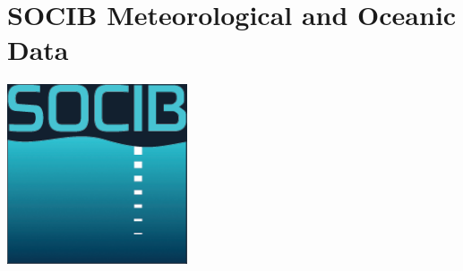 \documentclass[10pt,landscape]{article}
\begin{document}
\parbox{.6\textwidth}{\section*{SOCIB Meteorological and Oceanic Data}} \hfill \parbox{.1\textwidth}{\includegraphics[width=1.cm]{logo_socib_square}}

\end{document}
